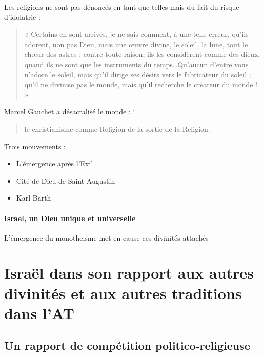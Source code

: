 Les religions ne sont pas dénoncés en tant que telles mais du fait du risque d'idolatrie : 

\begin{quote}
    « Certains en sont arrivés, je ne sais comment, à une telle erreur, qu’ils adorent, non pas Dieu, mais
une œuvre divine, le soleil, la lune, tout le chœur des astres ; contre toute raison, ils les considèrent
comme des dieux, quand ils ne sont que les instruments du temps…Qu’aucun d’entre vous n’adore le
soleil, mais qu’il dirige ses désirs vers le fabricateur du soleil ; qu’il ne divinise pas le monde, mais
qu’il recherche le créateur du monde ! » 
\end{quote}

Marcel Gauchet  a désacralisé le monde : 
`\begin{quote}
    le christianisme comme Religion de la sortie de la Religion. 
\end{quote}



Trois mouvements : 
\begin{itemize}
    \item L'émergence après l'Exil
    \item Cité de Dieu de Saint Augustin
    \item Karl Barth
\end{itemize}

\paragraph{Israel, un Dieu unique et universelle} L'émergence du monotheisme met en cause ces divinités attachés 


    
    
\section{Israël dans son rapport aux autres divinités et aux autres traditions dans l’AT}

\subsection{Un rapport de compétition politico-religieuse}

